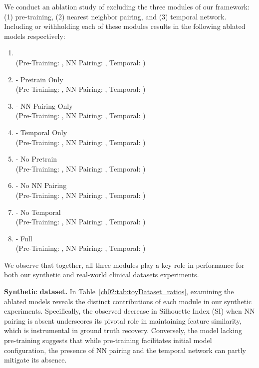 We conduct an ablation study of excluding the three modules of our framework: (1) pre-training, (2) nearest neighbor pairing, and (3) temporal network. 
Including or withholding each of these modules results in the following ablated models respectively:
\begin{enumerate}
    \item {} \\(Pre-Training: \ChTwoXmark, NN Pairing: \ChTwoXmark, Temporal: \ChTwoXmark)
    \item {} - Pretrain Only \\ (Pre-Training: \ChTwoCmark, NN Pairing: \ChTwoXmark, Temporal: \ChTwoXmark)
    \item {} - NN Pairing Only \\ (Pre-Training: \ChTwoXmark, NN Pairing: \ChTwoCmark, Temporal: \ChTwoXmark)
    \item {} - Temporal Only \\ (Pre-Training: \ChTwoXmark, NN Pairing: \ChTwoXmark, Temporal: \ChTwoCmark)
    \item {} - No Pretrain \\ (Pre-Training: \ChTwoXmark, NN Pairing: \ChTwoCmark, Temporal: \ChTwoCmark)
    \item {} - No NN Pairing \\ (Pre-Training: \ChTwoCmark, NN Pairing: \ChTwoXmark, Temporal: \ChTwoCmark)
    \item {} - No Temporal \\ (Pre-Training: \ChTwoCmark, NN Pairing: \ChTwoCmark, Temporal: \ChTwoXmark)
    \item {} - Full \\ (Pre-Training: \ChTwoCmark, NN Pairing: \ChTwoCmark, Temporal: \ChTwoCmark)
\end{enumerate}
We observe that together, all three modules play a key role in performance for both our synthetic and real-world clinical datasets experiments. 





\textbf{Synthetic dataset.} 
In Table~\ref{ch02:tab:toyDataset_ratios}, examining the ablated models reveals the distinct contributions of each module in our synthetic experiments.
Specifically, the observed decrease in Silhouette Index (SI) when NN pairing is absent underscores its pivotal role in maintaining feature similarity, which is instrumental in ground truth recovery.
Conversely, the model lacking pre-training suggests that while pre-training facilitates initial model configuration, the presence of NN pairing and the temporal network can partly mitigate its absence.


